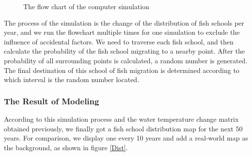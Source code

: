 \documentclass{mcmthesis}
\numberwithin{figure}{section}
\numberwithin{table}{section}
\begin{document}
\begin{figure}[H]
  \caption{The flow chart of the computer simulation}\label{matlabflow}
\end{figure}

The process of the simulation is the change of the distribution of fish schools per year, and we run the flowchart multiple times for one simulation to exclude the influence of accidental factors. We need to traverse each fish school, and then calculate the probability of the fish school migrating to a nearby point. After the probability of all surrounding points is calculated, a random number is generated. The final destination of this school of fish migration is determined according to which interval is the random number located.

\subsubsection{The Result of Modeling}
According to this simulation process and the water temperature change matrix obtained previously, we finally got a fish school distribution map for the next 50 years. For comparison, we display one every 10 years and add a real-world map as the background, as shown in figure \ref{Dist}.
\end{document}
